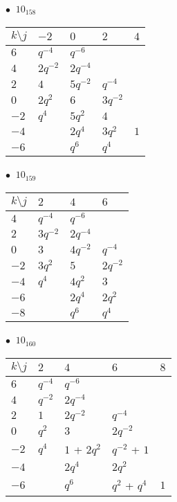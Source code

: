 %
\begin{minipage}{\linewidth}
$\bullet\ $ $10_{158}$ \vspace{0.5em} \\
\begin{tabular}{l|llll}
$k \setminus j$ & $-2$ & $0$ & $2$ & $4$ \\
\hline
$6$ & $q^{-4}$ & $q^{-6}$ &  &  \\
$4$ & $2q^{-2}$ & $2q^{-4}$ &  &  \\
$2$ & $4$ & $5q^{-2}$ & $q^{-4}$ &  \\
$0$ & $2q^{2}$ & $6$ & $3q^{-2}$ &  \\
$-2$ & $q^{4}$ & $5q^{2}$ & $4$ &  \\
$-4$ &  & $2q^{4}$ & $3q^{2}$ & $1$ \\
$-6$ &  & $q^{6}$ & $q^{4}$ &  \\
\end{tabular}
\vspace{2em}
\end{minipage}
%
\begin{minipage}{\linewidth}
$\bullet\ $ $10_{159}$ \vspace{0.5em} \\
\begin{tabular}{l|lll}
$k \setminus j$ & $2$ & $4$ & $6$ \\
\hline
$4$ & $q^{-4}$ & $q^{-6}$ &  \\
$2$ & $3q^{-2}$ & $2q^{-4}$ &  \\
$0$ & $3$ & $4q^{-2}$ & $q^{-4}$ \\
$-2$ & $3q^{2}$ & $5$ & $2q^{-2}$ \\
$-4$ & $q^{4}$ & $4q^{2}$ & $3$ \\
$-6$ &  & $2q^{4}$ & $2q^{2}$ \\
$-8$ &  & $q^{6}$ & $q^{4}$ \\
\end{tabular}
\vspace{2em}
\end{minipage}
%
\begin{minipage}{\linewidth}
$\bullet\ $ $10_{160}$ \vspace{0.5em} \\
\begin{tabular}{l|llll}
$k \setminus j$ & $2$ & $4$ & $6$ & $8$ \\
\hline
$6$ & $q^{-4}$ & $q^{-6}$ &  &  \\
$4$ & $q^{-2}$ & $2q^{-4}$ &  &  \\
$2$ & $1$ & $2q^{-2}$ & $q^{-4}$ &  \\
$0$ & $q^{2}$ & $3$ & $2q^{-2}$ &  \\
$-2$ & $q^{4}$ & $1$ + $2q^{2}$ & $q^{-2}$ + $1$ &  \\
$-4$ &  & $2q^{4}$ & $2q^{2}$ &  \\
$-6$ &  & $q^{6}$ & $q^{2}$ + $q^{4}$ & $1$ \\
\end{tabular}
\vspace{2em}
\end{minipage}
